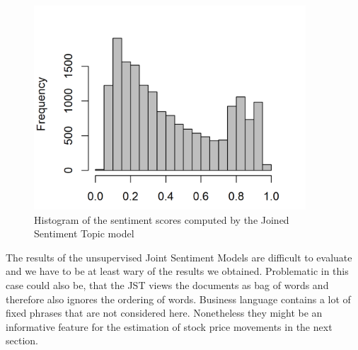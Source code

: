 \begin{figure}[h]
\centering
\includegraphics[width=4in]{figures/2SentimentsJST_Histogram.png}
\caption{Histogram of the sentiment scores computed by the Joined Sentiment Topic model}
\label{fig:JSTSentiment}
\end{figure}
The results of the unsupervised Joint Sentiment Models are difficult to evaluate and we have to be at least wary of the results we obtained. Problematic in this case could also be, that the JST views the documents as bag of words and therefore also ignores the ordering of words. Business language contains a lot of fixed phrases that are not considered here. Nonetheless they might be an informative feature for the estimation of stock price movements in the next section. 



